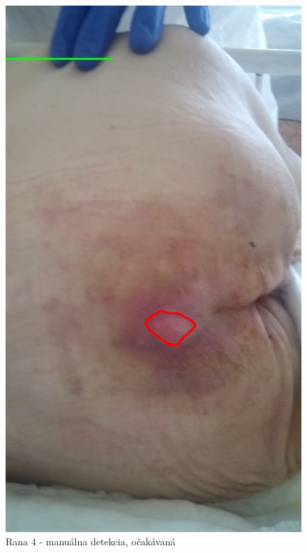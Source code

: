 \begin{figure}[h]
   \begin{minipage}{0.48\textwidth}
     \centering
     \includegraphics[scale=0.35]{fig/4m.jpeg}
      \caption{Rana 4 - manuálna detekcia, očakávaná}
      \label{fig:w4}
   \end{minipage}\hfill
   \begin{minipage}{0.48\textwidth}
     \centering

\end{minipage}
\end{figure}
